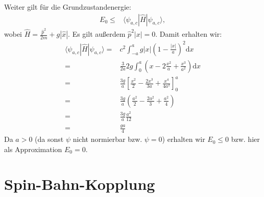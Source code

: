 \documentclass[11pt, ngerman, fleqn, DIV=15, headinclude]{scrartcl}
\newcommand{\dup}{\mathrm d}
\begin{document}
	Weiter gilt für die Grundzustandenergie:
	\begin{align*}
		E_0\le & \langle \psi_{a,c}|\hat{H}| \psi_{a,c} \rangle, 
	\end{align*}
	wobei $\hat{H}=\frac{\hat{p}^2}{2m}+g|\hat{x}|$.
	Es gilt außerdem $\hat{p}^2|x|=0$. Damit erhalten wir:
	\begin{align*}
		\langle \psi_{a,c}|\hat{H}| \psi_{a,c} \rangle=& c^2\int_{-a}^a g |x| \left(1-\frac{|x|}{a}\right)^2 \dup x \\
			=& \frac{3}{2a} 2g\int_0^a \left(x-2\frac{x^2}{a}+\frac{x^3}{a^2}\right) \dup x \\
			=& \frac{3g}{a} \left[ \frac{x^2}{2}-\frac{2x^3}{3a}+\frac{x^4}{4a^2}\right]_0^a \\
			=& \frac{3g}{a} \left(\frac{a^2}{2}-\frac{2a^2}{3}+\frac{a^2}{4}\right) \\
			=&\frac{3g}{a}\frac{a^2}{12} \\
			=& \frac{ga}{4}
	\end{align*}
	Da $a>0$ (da sonst $\psi$ nicht normierbar bzw. $\psi=0$) erhalten wir $E_0\le 0$ bzw. hier als Approximation $E_0=0$.

\section{Spin-Bahn-Kopplung}
\end{document}
